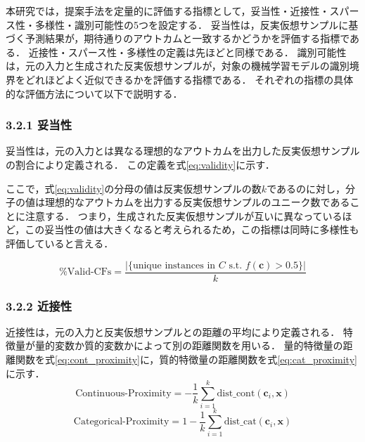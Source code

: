 \documentclass[dvipdfmx]{jreport}
\begin{document}
本研究では，提案手法を定量的に評価する指標として，妥当性・近接性・スパース性・多様性・識別可能性の5つを設定する．
妥当性は，反実仮想サンプルに基づく予測結果が，期待通りのアウトカムと一致するかどうかを評価する指標である．
近接性・スパース性・多様性の定義は先ほどと同様である．
識別可能性は，元の入力と生成された反実仮想サンプルが，対象の機械学習モデルの識別境界をどれほどよく近似できるかを評価する指標である．
それぞれの指標の具体的な評価方法について以下で説明する．

\subsubsection{3.2.1 妥当性}
妥当性は，元の入力とは異なる理想的なアウトカムを出力した反実仮想サンプルの割合により定義される．
この定義を式\eqref{eq:validity}に示す．

ここで，式\eqref{eq:validity}の分母の値は反実仮想サンプルの数$k$であるのに対し，分子の値は理想的なアウトカムを出力する反実仮想サンプルのユニーク数であることに注意する．
つまり，生成された反実仮想サンプルが互いに異なっているほど，この妥当性の値は大きくなると考えられるため，この指標は同時に多様性も評価していると言える．



\begin{equation}
\%\text{Valid-CFs} = \frac{|\{\text{unique instances in } C \text{ s.t. } f(\bm{c}) > 0.5 \}|}{k} \label{eq:validity}
\end{equation}


\subsubsection{3.2.2 近接性}
近接性は，元の入力と反実仮想サンプルとの距離の平均により定義される．
特徴量が量的変数か質的変数かによって別の距離関数を用いる．
量的特徴量の距離関数を式\eqref{eq:cont_proximity}に，質的特徴量の距離関数を式\eqref{eq:cat_proximity}に示す．
\begin{equation}
\text{Continuous-Proximity} = -\frac{1}{k} \sum_{i=1}^{k} \text{dist\_cont}(\bm{c}_i, \bm{x}) \label{eq:cont_proximity}
\end{equation}
\begin{equation}
\text{Categorical-Proximity} = 1 - \frac{1}{k} \sum_{i=1}^{k} \text{dist\_cat}(\bm{c}_i, \bm{x}) \label{eq:cat_proximity}
\end{equation}
\end{document}
